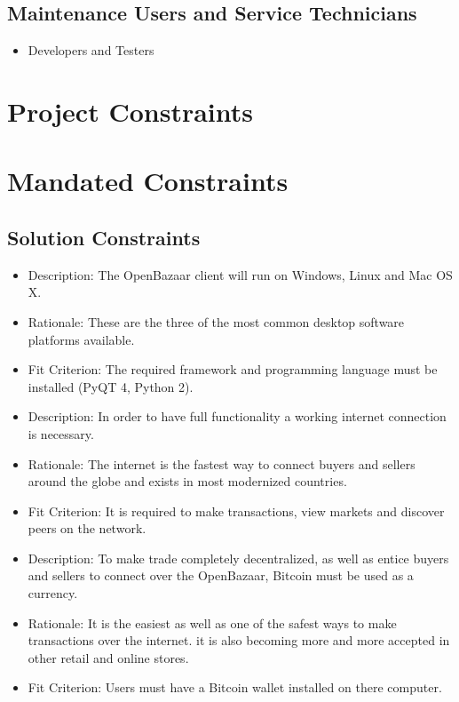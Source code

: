 \documentclass{article}
\begin{document}
\subsection{Maintenance Users and Service Technicians}
\begin{itemize}
\item
Developers and Testers
\end{itemize}

\section*{Project Constraints}

\section{Mandated Constraints}

\subsection{Solution Constraints}
\begin{itemize}

\item
Description: The OpenBazaar client will run on Windows, Linux and Mac OS X. 

\item
Rationale: These are the three of the most common desktop software platforms available. 

\item
Fit Criterion: The required framework and programming language must be installed (PyQT 4, Python 2).

\item
Description: In order to have full functionality a working internet connection is necessary.

\item
Rationale: The internet is the fastest way to connect buyers and sellers around the globe and exists in most modernized countries.

\item
Fit Criterion: It is required to make transactions, view markets and discover peers on the network.

\item
Description: To make trade completely decentralized, as well as entice buyers and sellers to connect over the OpenBazaar, Bitcoin must be used as a currency. 

\item
Rationale: It is the easiest as well as one of the safest ways to make transactions over the internet. it is also becoming more and more accepted in other retail and online stores. 

\item
Fit Criterion: Users must have a Bitcoin wallet installed on there computer. 

\end{itemize}
\end{document}
